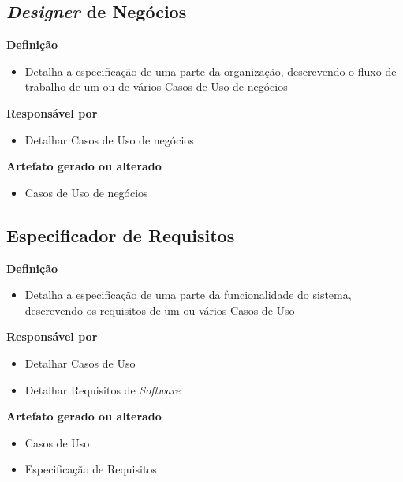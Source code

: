 \subsection{\textit{Designer} de Negócios}

\textbf{Definição}
\begin{itemize}
\item Detalha a especificação de uma parte da organização, descrevendo o fluxo de trabalho de um ou de vários Casos de Uso de negócios
\end{itemize}

\textbf{Responsável por}
\begin{itemize}
\item Detalhar Casos de Uso de negócios
\end{itemize}

\textbf{Artefato gerado ou alterado}
\begin{itemize}
\item Casos de Uso de negócios
\end{itemize}

\subsection{Especificador de Requisitos}

\textbf{Definição}
\begin{itemize}
\item Detalha a especificação de uma parte da funcionalidade do sistema, descrevendo os requisitos de um ou vários Casos de Uso 
\end{itemize}

\textbf{Responsável por}
\begin{itemize}
\item Detalhar Casos de Uso
\item Detalhar Requisitos de \textit{Software}
\end{itemize}

\textbf{Artefato gerado ou alterado}
\begin{itemize}
\item Casos de Uso
\item Especificação de Requisitos
\end{itemize}
